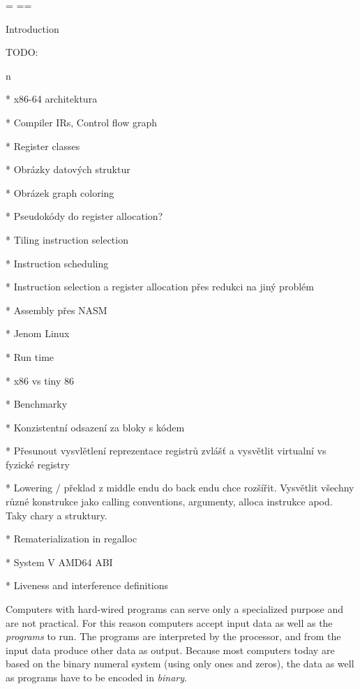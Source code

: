 {\nopagenumbers
  {\pgbackground={
    \picwidth=\pagewidth \picheight=\pageheight
    }
    \null\vfil\break}
  \null\vfil\break}
\makefront

\chap Introduction

TODO:

\begitems \style n

* x86-64 architektura

* Compiler IRs, Control flow graph

* Register classes

* Obrázky datových struktur

* Obrázek graph coloring

* Pseudokódy do register allocation?

* Tiling instruction selection

* Instruction scheduling

* Instruction selection a register allocation přes redukci na jiný problém

* Assembly přes NASM

* Jenom Linux

* Run time

* x86 vs tiny 86

* Benchmarky

* Konzistentní odsazení za bloky s kódem

* Přesunout vysvlětlení reprezentace registrů zvlášť a vysvětlit virtualní vs
fyzické registry

* Lowering / překlad z middle endu do back endu chce rozšířit. Vysvětlit všechny
různé konstrukce jako calling conventions, argumenty, alloca instrukce apod.
Taky chary a struktury.

* Rematerialization in regalloc

* System V AMD64 ABI

* Liveness and interference definitions
\enditems


Computers with hard-wired programs can serve only a specialized purpose and are
not practical. For this reason computers accept input data as well as the {\em
programs} to run. The programs are interpreted by the processor, and from the
input data produce other data as output. Because most computers today are based
on the binary numeral system (using only ones and zeros), the data as well as
programs have to be encoded in {\em binary}.

